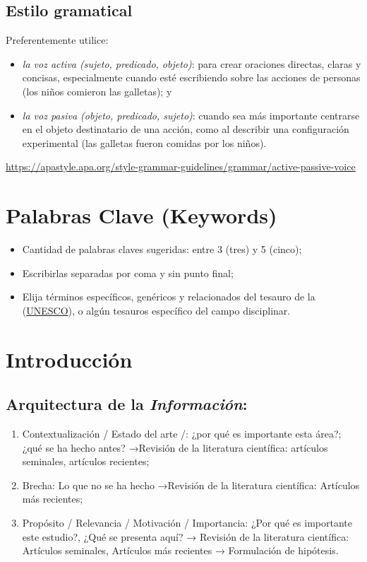 \documentclass[a4paper,12pt]{article}
\begin{document}
\subsection{Estilo gramatical}

Preferentemente utilice:

\begin{itemize}
    \item \textit{la voz activa (sujeto, predicado, objeto)}: para crear oraciones directas, claras y concisas, especialmente cuando esté escribiendo sobre las acciones de personas (los niños comieron las galletas); y
    \item \textit{la voz pasiva (}\textit{objeto, predicado, sujeto}\textit{)}: cuando sea más importante centrarse en el objeto destinatario de una acción, como al describir una configuración experimental (las galletas fueron comidas por los niños).
\end{itemize}
\href{https://apastyle.apa.org/style-grammar-guidelines/grammar/active-passive-voice}{https://apastyle.apa.org/style-grammar-guidelines/grammar/active-passive-voice}

\section{Palabras Clave (Keywords)}

\begin{itemize}
    \item Cantidad de palabras claves sugeridas: entre 3 (tres) y 5 (cinco);
    \item Escribirlas separadas por coma y sin punto final;
    \item Elija términos específicos, genéricos y relacionados del tesauro de la  (\href{https://vocabularies.unesco.org/browser/thesaurus/en/}{UNESCO}), o algún tesauros específico del campo disciplinar.
\end{itemize}
\newpage
\section{Introducción}
\subsection{Arquitectura de la 
{\textit{Información}}: }
\begin{enumerate}
    \item Contextualización / Estado del arte /: ¿por qué es importante esta área?; ¿qué se ha hecho antes? →Revisión de la literatura científica: artículos seminales, artículos recientes;
    \item Brecha: Lo que no se ha hecho →Revisión de la literatura científica: Artículos más recientes;
    \item Propósito / Relevancia / Motivación / Importancia: ¿Por qué es importante este estudio?, ¿Qué se presenta aquí? → Revisión de la literatura científica: Artículos seminales, Artículos más recientes → Formulación de hipótesis.
\end{enumerate}
\end{document}

